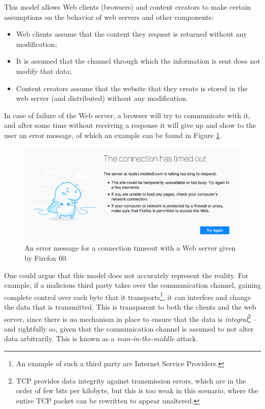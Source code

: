 \documentclass[mscthesis]{usiinfthesis}
\begin{document}
This model allows Web clients (browsers) and content creators to make certain assumptions on the behavior of web servers and other components:
\begin{itemize}
	\item Web clients assume that the content they request is returned without any modification;
	\item It is assumed that the channel through which the information is sent does not modify that data;
	\item Content creators assume that the website that they create is stored in the web server (and distributed) without any modification.
\end{itemize}
In case of failure of the Web server, a browser will try to communicate with it, and after some time without receiving a response it will give up and show to the user an error message, of which an example can be found in Figure \ref{fig:browsertimeoutexample}.
\begin{figure}[b]
	\centering
	\includegraphics[width=0.9\linewidth]{img/browser-timeout-example}
	\caption{An error message for a connection timeout with a Web server given by Firefox 60.}
	\label{fig:browsertimeoutexample}
\end{figure}

One could argue that this model does not accurately represent the reality. For example, if a malicious third party takes over the communication channel, gaining complete control over each byte that it transports\footnote{An example of such a third party are Internet Service Providers.}, it can interfere and change the data that is transmitted. This is transparent to both the clients and the web server, since there is no mechanism in place to ensure that the data is \textit{integral}\footnote{TCP provides data integrity against transmission errors, which are in the order of few bits per kilobyte, but this is too weak in this scenario, where the entire TCP packet can be rewritten to appear unaltered.} -- and rightfully so, given that the communication channel is assumed to not alter data arbitrarily. This is known as a \textit{man-in-the-middle} attack.
\end{document}

